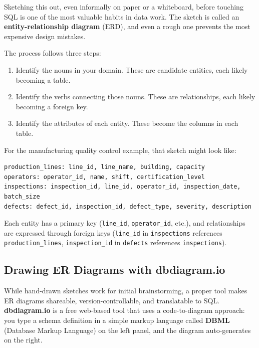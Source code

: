 \documentclass[
  letterpaper,
  DIV=11,
  numbers=noendperiod]{scrreprt}
\providecommand{\tightlist}{%
  \setlength{\itemsep}{0pt}\setlength{\parskip}{0pt}}
\begin{document}
Sketching this out, even informally on paper or a whiteboard, before
touching SQL is one of the most valuable habits in data work. The sketch
is called an \textbf{entity-relationship diagram} (ERD), and even a
rough one prevents the most expensive design mistakes.

The process follows three steps:

\begin{enumerate}
\def\labelenumi{\arabic{enumi}.}
\tightlist
\item
  Identify the nouns in your domain. These are candidate entities, each
  likely becoming a table.
\item
  Identify the verbs connecting those nouns. These are relationships,
  each likely becoming a foreign key.
\item
  Identify the attributes of each entity. These become the columns in
  each table.
\end{enumerate}

For the manufacturing quality control example, that sketch might look
like:

\begin{verbatim}
production_lines: line_id, line_name, building, capacity
operators: operator_id, name, shift, certification_level
inspections: inspection_id, line_id, operator_id, inspection_date, batch_size
defects: defect_id, inspection_id, defect_type, severity, description
\end{verbatim}

Each entity has a primary key (\texttt{line\_id}, \texttt{operator\_id},
etc.), and relationships are expressed through foreign keys
(\texttt{line\_id} in \texttt{inspections} references
\texttt{production\_lines}, \texttt{inspection\_id} in \texttt{defects}
references \texttt{inspections}).

\subsection{Drawing ER Diagrams with
dbdiagram.io}\label{drawing-er-diagrams-with-dbdiagram.io}

While hand-drawn sketches work for initial brainstorming, a proper tool
makes ER diagrams shareable, version-controllable, and translatable to
SQL. \textbf{dbdiagram.io} is a free web-based tool that uses a
code-to-diagram approach: you type a schema definition in a simple
markup language called \textbf{DBML} (Database Markup Language) on the
left panel, and the diagram auto-generates on the right.
\end{document}
